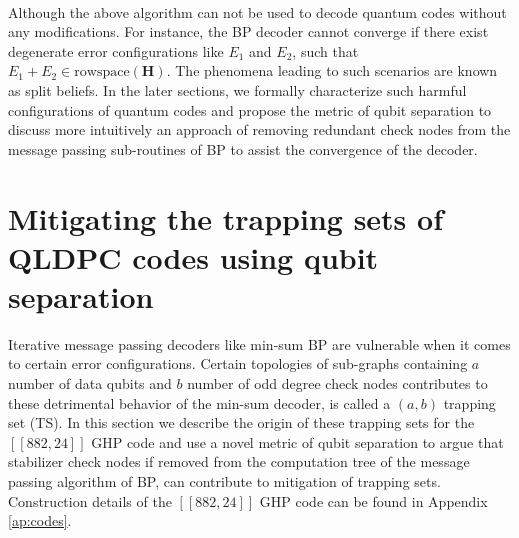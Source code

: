 \documentclass[%
 reprint,
 amsmath,amssymb,
 aps,
pra,
showkeys,
]{revtex4-2}
\begin{document}
\\
Although the above algorithm can not be used to decode quantum codes without any modifications.
For instance, the BP decoder cannot converge if there exist degenerate error configurations like $E_1$ and $E_2$, such that $E_1 + E_2 \in \text{rowspace}(\mathbf{H})$.
The phenomena leading to such scenarios are known as split beliefs.
In the later sections, we formally characterize such harmful configurations of quantum codes and propose the metric of qubit separation to discuss more intuitively an approach of removing redundant check nodes from the message passing sub-routines of BP to assist the convergence of the decoder.
\section{Mitigating the trapping sets of QLDPC codes using qubit separation}
\label{sec:trappingset-qubitseparation}
Iterative message passing decoders like min-sum BP are vulnerable when it comes to certain error configurations.
Certain topologies of sub-graphs containing $a$ number of data qubits and $b$ number of odd degree check nodes contributes to these detrimental behavior of the min-sum decoder, is called a $(a,b)$ trapping set (TS).
In this section we describe the origin of these trapping sets for the $[[882,24]]$ GHP code and use a novel metric of qubit separation to argue that stabilizer check nodes if removed from the computation tree of the message passing algorithm of BP, can contribute to mitigation of trapping sets.
Construction details of the $[[882,24]]$ GHP code can be found in Appendix \ref{ap:codes}.
\end{document}

